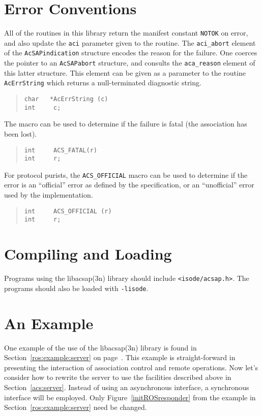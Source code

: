 \section	{Error Conventions}\label{acs:errors}
All of the routines in this library return the manifest constant \verb"NOTOK"
on error,
and also update the \verb"aci" parameter given to the routine.
The \verb"aci_abort" element of the \verb"AcSAPindication" structure encodes
the reason for the failure.
One coerces the pointer to an \verb"AcSAPabort" structure,
and consults the \verb"aca_reason" element of this latter structure.
This element can be given as a parameter to the routine \verb"AcErrString"
which returns a null-terminated diagnostic string.
\begin{quote}\small\begin{verbatim}
char   *AcErrString (c)
int     c;
\end{verbatim}\end{quote}
The \verb"" macro can be used to determine if the failure is fatal
(the association has been lost).
\begin{quote}\small\begin{verbatim}
int     ACS_FATAL(r)
int     r;
\end{verbatim}\end{quote}
For protocol purists,
the \verb"ACS_OFFICIAL" macro can be used to determine if the error is an
``official'' error as defined by the specification,
or an ``unofficial'' error used by the implementation.
\begin{quote}\small\begin{verbatim}
int     ACS_OFFICIAL (r)
int     r;
\end{verbatim}\end{quote}

\section	{Compiling and Loading}
Programs using the \man libacsap(3n) library should include
\verb"<isode/acsap.h>".
The programs should also be loaded with \verb"-lisode".

\section	{An Example}\label{acs:example}
One example of the use of the \man libacsap(3n) library is found in
Section~\ref{ros:example:server} on page~\pageref{ros:example:server}.
This example is straight-forward in presenting the interaction of association
control and remote operations.
Now let's consider how to rewrite the server to use the facilities described
above in Section~\ref{acs:server}.
Instead of using an asynchronous interface,
a synchronous interface will be employed.
Only Figure~\ref{initROSresponder} from the example in
Section~\ref{ros:example:server} need be changed.

